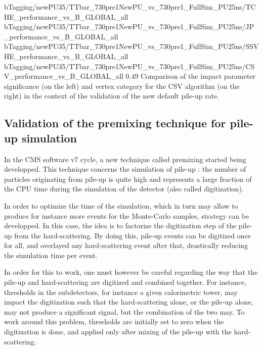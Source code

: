                           {bTagging/newPU35/TTbar_730pre1NewPU_vs_730pre1_FullSim_PU25ns/TCHE_performance_vs_B_GLOBAL_all}
                          {bTagging/newPU35/TTbar_730pre1NewPU_vs_730pre1_FullSim_PU25ns/JP_performance_vs_B_GLOBAL_all}
                          {bTagging/newPU35/TTbar_730pre1NewPU_vs_730pre1_FullSim_PU25ns/SSVHE_performance_vs_B_GLOBAL_all}
                          {bTagging/newPU35/TTbar_730pre1NewPU_vs_730pre1_FullSim_PU25ns/CSV_performance_vs_B_GLOBAL_all}
                          {0.49}
                          {Comparison of the impact parameter significance (on the left)
                          and vertex category for the CSV algorithm (on the right) in the
                          context of the validation of the new default pile-up rate.}

        \subsection{Validation of the premixing technique for pile-up simulation}

        In the CMS software v7 cycle, a new technique called premixing started being developped.
        This technique concerns the simulation of pile-up : the number of particles
        originating from pile-up is quite high and represents a large fraction of the CPU time
        during the simulation of the detector (also called digitization).

        In order to optimize
        the time of the simulation, which in turn may allow to produce for instance more events
        for the Monte-Carlo samples, strategy can be developped. In this case, the idea
        is to factorize the digitization step of the pile-up from the hard-scattering.
        By doing this, pile-up events can be digitized once for all, and overlayed
        any hard-scattering event after that, drastically reducing the simulation time
        per event.

        In order for this to work, one must however be careful regarding the way that the
        pile-up and hard-scattering are digitized and combined together. For instance,
        thresholds in the subdetectors, for instance a given calorimetric tower, may
        impact the digitization such that the hard-scattering alone, or the pile-up alone,
        may not produce a significant signal, but the combination of the two may. To
        work around this problem, thresholds are initially set to zero when the digitization
        is done, and applied only after mixing of the pile-up with the hard-scattering.

